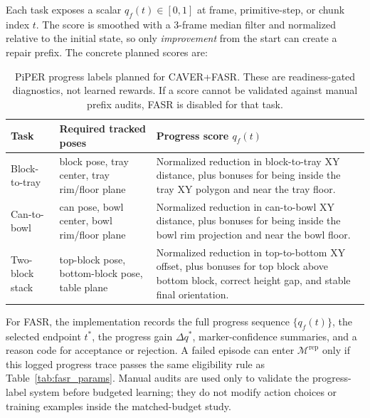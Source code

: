 \documentclass[10pt]{article}
\theoremstyle{plain}
\theoremstyle{definition}
\theoremstyle{remark}
\begin{document}
Each task exposes a scalar $q_f(t)\in[0,1]$ at frame, primitive-step, or chunk index $t$. The score is smoothed with a 3-frame median filter and normalized relative to the initial state, so only \emph{improvement} from the start can create a repair prefix. The concrete planned scores are:
\begin{table}[H]
\centering
\small
\caption{PiPER progress labels planned for CAVER+FASR. These are readiness-gated diagnostics, not learned rewards. If a score cannot be validated against manual prefix audits, FASR is disabled for that task.\label{tab:piper_progress_labels}}
\begin{tabularx}{\linewidth}{@{}p{2.7cm}p{4.3cm}X@{}}
\toprule
Task & Required tracked poses & Progress score $q_f(t)$ \\
\midrule
Block-to-tray & block pose, tray center, tray rim/floor plane & Normalized reduction in block-to-tray XY distance, plus bonuses for being inside the tray XY polygon and near the tray floor. \\
Can-to-bowl & can pose, bowl center, bowl rim/floor plane & Normalized reduction in can-to-bowl XY distance, plus bonuses for being inside the bowl rim projection and near the bowl floor. \\
Two-block stack & top-block pose, bottom-block pose, table plane & Normalized reduction in top-to-bottom XY offset, plus bonuses for top block above bottom block, correct height gap, and stable final orientation. \\
\bottomrule
\end{tabularx}
\end{table}

For FASR, the implementation records the full progress sequence $\{q_f(t)\}$, the selected endpoint $t^*$, the progress gain $\Delta q^*$, marker-confidence summaries, and a reason code for acceptance or rejection. A failed episode can enter $\mathcal M^{\mathrm{rep}}$ only if this logged progress trace passes the same eligibility rule as Table~\ref{tab:fasr_params}. Manual audits are used only to validate the progress-label system before budgeted learning; they do not modify action choices or training examples inside the matched-budget study.
\end{document}
